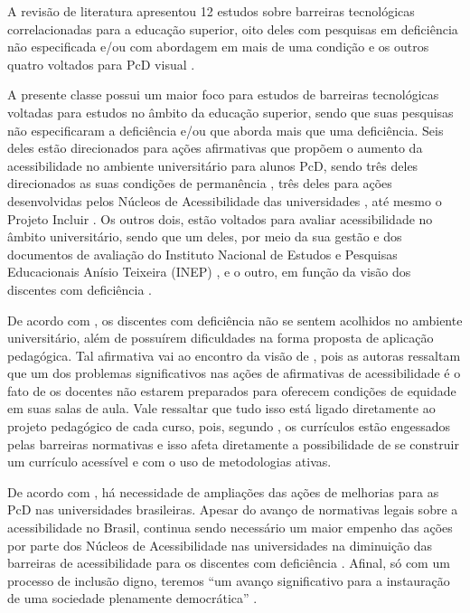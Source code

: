 \documentclass{textolivre}
\begin{document}
A revisão de literatura apresentou 12 estudos sobre barreiras tecnológicas correlacionadas para a educação superior, oito deles com pesquisas em deficiência não especificada e/ou com abordagem em mais de uma condição \cite{anache2018, branco2019, cantoranipilatti2015, ciantelli2016, garcia2018, melo2018, oliveira2013, siqueira2010} e os outros quatro voltados para PcD visual \cite{carvalho2018, ortega2013, silva+ferreira2017, wataya2006}.

A presente classe possui um maior foco para estudos de barreiras tecnológicas voltadas para estudos no âmbito da educação superior, sendo que suas pesquisas não especificaram a deficiência e/ou que aborda mais que uma deficiência. Seis deles estão direcionados para ações afirmativas \cite{anache2018, ciantelli2016, garcia2018, melo2018, oliveira2013, siqueira2010} que propõem o aumento da acessibilidade no ambiente universitário para alunos PcD, sendo três deles direcionados as suas condições de permanência \cite{anache2018, garcia2018, oliveira2013}, três deles para ações desenvolvidas pelos Núcleos de Acessibilidade das universidades \cite{ciantelli2016, melo2018}, até mesmo o Projeto Incluir \cite{siqueira2010}. Os outros dois, estão voltados para avaliar acessibilidade no âmbito universitário, sendo que um deles, por meio da sua gestão e dos documentos de avaliação do Instituto Nacional de Estudos e Pesquisas Educacionais Anísio Teixeira (INEP) \cite{cantoranipilatti2015}, e o outro, em função da visão dos discentes com deficiência \cite{branco2019}.

De acordo com \textcite{oliveira2013}, os discentes com deficiência não se sentem acolhidos no ambiente universitário, além de possuírem dificuldades na forma proposta de aplicação pedagógica. Tal afirmativa vai ao encontro da visão de \textcite{garcia2018}, pois as autoras ressaltam que um dos problemas significativos nas ações de afirmativas de acessibilidade é o fato de os docentes não estarem preparados para oferecem condições de equidade em suas salas de aula. Vale ressaltar que tudo isso está ligado diretamente ao projeto pedagógico de cada curso, pois, segundo \textcite{anache2018}, os currículos estão engessados pelas barreiras normativas e isso afeta diretamente a possibilidade de se construir um currículo acessível e com o uso de metodologias ativas.

De acordo com \textcite{siqueira2010, ciantelli2016, melo2018}, há necessidade de ampliações das ações de melhorias para as PcD nas universidades brasileiras. Apesar do avanço de normativas legais sobre a acessibilidade no Brasil, continua sendo necessário um maior empenho das ações por parte dos Núcleos de Acessibilidade nas universidades \cite{ciantelli2016} na diminuição das barreiras de acessibilidade para os discentes com deficiência \cite{melo2018}. Afinal, só com um processo de inclusão digno, teremos “um avanço significativo para a instauração de uma sociedade plenamente democrática” \cite[p. 135]{siqueira2010}.
\end{document}

